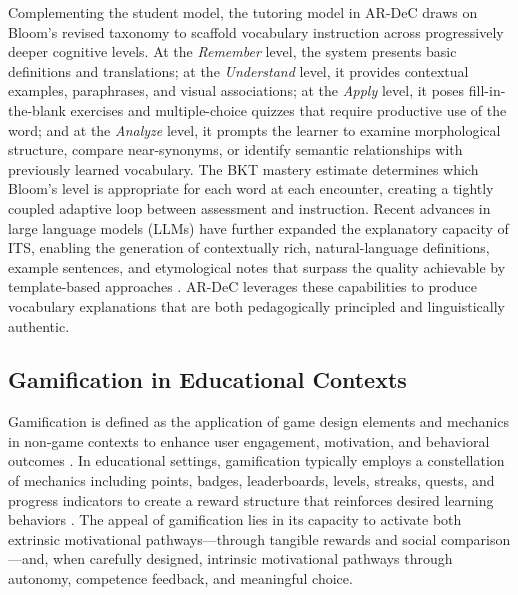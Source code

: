 Complementing the student model, the tutoring model in AR-DeC draws on Bloom's revised taxonomy \cite{Bloom1956, Krathwohl2002} to scaffold vocabulary instruction across progressively deeper cognitive levels. At the \textit{Remember} level, the system presents basic definitions and translations; at the \textit{Understand} level, it provides contextual examples, paraphrases, and visual associations; at the \textit{Apply} level, it poses fill-in-the-blank exercises and multiple-choice quizzes that require productive use of the word; and at the \textit{Analyze} level, it prompts the learner to examine morphological structure, compare near-synonyms, or identify semantic relationships with previously learned vocabulary. The BKT mastery estimate determines which Bloom's level is appropriate for each word at each encounter, creating a tightly coupled adaptive loop between assessment and instruction. Recent advances in large language models (LLMs) have further expanded the explanatory capacity of ITS, enabling the generation of contextually rich, natural-language definitions, example sentences, and etymological notes that surpass the quality achievable by template-based approaches \cite{Chen2020, Lin2023}. AR-DeC leverages these capabilities to produce vocabulary explanations that are both pedagogically principled and linguistically authentic.

\subsection{Gamification in Educational Contexts}
\label{subsec:gamification}

Gamification is defined as the application of game design elements and mechanics in non-game contexts to enhance user engagement, motivation, and behavioral outcomes \cite{Deterding2011}. In educational settings, gamification typically employs a constellation of mechanics including points, badges, leaderboards, levels, streaks, quests, and progress indicators to create a reward structure that reinforces desired learning behaviors \cite{Hamari2014}. The appeal of gamification lies in its capacity to activate both extrinsic motivational pathways---through tangible rewards and social comparison---and, when carefully designed, intrinsic motivational pathways through autonomy, competence feedback, and meaningful choice.

